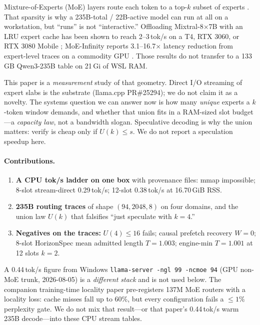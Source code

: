 \documentclass[11pt]{article}
\newcommand{\tps}{tok/s}
\begin{document}
Mixture-of-Experts (MoE) layers route each token to a top-$k$ subset of
experts \citep{shazeer2017moe,fedus2022switch}. That sparsity is why a
235B-total / 22B-active model \citep{yang2025qwen3} can run at all on a
workstation, but ``runs'' is not ``interactive.'' Offloading Mixtral-8$\times$7B
with an LRU expert cache has been shown to reach 2--3\,\tps{} on a T4, RTX
3060, or RTX 3080 Mobile \citep{eliseev2023mixtraloffload}; MoE-Infinity reports 3.1--16.7$\times$
latency reduction from expert-level traces on a commodity GPU
\citep{xue2024moeinfinity}. Those results do not transfer to a 133\,GB
Qwen3-235B table on 21\,Gi of WSL RAM.

This paper is a \emph{measurement} study of that geometry. Direct I/O streaming
of expert slabs is the substrate (llama.cpp PR\#25294); we do not claim it as a
novelty. The systems question we can answer now is how many \emph{unique}
experts a $k$-token window demands, and whether that union fits in a RAM-sized
slot budget---a \emph{capacity law}, not a bandwidth slogan. Speculative
decoding \citep{leviathan2023speculative} is why the union matters: verify is
cheap only if $U(k)\le s$. We do not report a speculation speedup here.

\paragraph{Contributions.}
\begin{enumerate}\itemsep2pt
\item \textbf{A CPU tok/s ladder on one box} with provenance files: mmap
impossible; 8-slot stream-direct 0.29\,\tps{}; 12-slot 0.38\,\tps{} at 16.70\,GiB RSS.
\item \textbf{235B routing traces} of shape $(94,2048,8)$ on four domains, and the
union law $U(k)$ that falsifies ``just speculate with $k{=}4$.''
\item \textbf{Negatives on the traces:} $U(4)\le 16$ fails; causal prefetch
recovery $W{=}0$; 8-slot HorizonSpec mean admitted length $T{=}1.003$;
engine-min $T{=}1.001$ at 12 slots $k{=}2$.
\end{enumerate}

A 0.44\,\tps{} figure from Windows \texttt{llama-server -ngl 99 -ncmoe 94}
(GPU non-MoE trunk, 2026-08-05) is a \emph{different stack} and is not used
below. The companion training-time locality paper
\citep{suram2026cacheable} pre-registers 137M MoE routers with a locality
loss: cache misses fall up to 60\%, but every configuration fails a
$\le 1\%$ perplexity gate. We do not mix that result---or that paper's
0.44\,\tps{} warm 235B decode---into these CPU stream tables.
\end{document}
